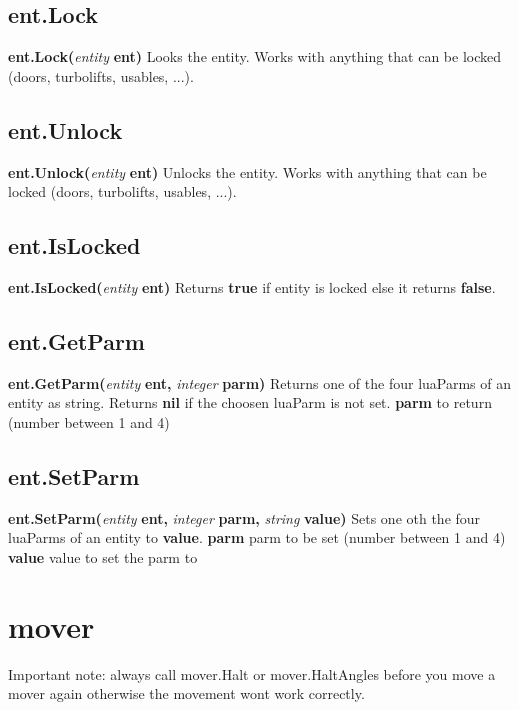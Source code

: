 \documentclass{scrreprt}
\begin{document}
\subsection{ent.Lock}
\label{enty-lock}
\textbf{ent.Lock(}\textit{entity}\textbf{ ent)}
\newline
Looks the entity. Works with anything that can be locked (doors, turbolifts, usables, ...).
\subsection{ent.Unlock}
\label{enty-unlock}
\textbf{ent.Unlock(}\textit{entity}\textbf{ ent)}
\newline
Unlocks the entity. Works with anything that can be locked (doors, turbolifts, usables, ...).
\subsection{ent.IsLocked}
\label{enty-locked}
\textbf{ent.IsLocked(}\textit{entity}\textbf{ ent)}
\newline
Returns \textbf{true} if entity is locked else it returns \textbf{false}.
\subsection{ent.GetParm}
\label{enty-getparm}
\textbf{ent.GetParm(}\textit{entity }\textbf{ent, }\textit{integer }\textbf{parm)}
\newline
Returns one of the four luaParms of an entity as string. Returns \textbf{nil} if the choosen luaParm is not set.
\newline
\textbf{parm} to return (number between 1 and 4)
\subsection{ent.SetParm}
\label{enty-setparm}
\textbf{ent.SetParm(}\textit{entity }\textbf{ent, }\textit{integer }\textbf{parm, }\textit{string }\textbf{value)}
\newline
Sets one oth the four luaParms of an entity to \textbf{value}.
\newline
\textbf{parm} parm to be set (number between 1 and 4)
\newline
\textbf{value} value to set the parm to
\newpage
\section{mover}
\label{mver}
Important note: always call mover.Halt or mover.HaltAngles before you move a mover again otherwise the movement wont work correctly.
\end{document}
